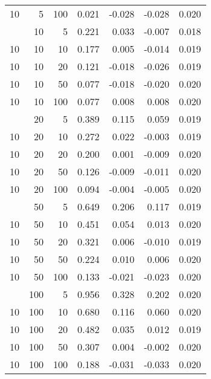 \begin{table}
\begin{tabular}[t]{lrrrrrr}
10 & 5 & 100 & 0.021 & -0.028 & -0.028 & 0.020\\
\addlinespace
10 & 10 & 5 & 0.221 & 0.033 & -0.007 & 0.018\\
10 & 10 & 10 & 0.177 & 0.005 & -0.014 & 0.019\\
10 & 10 & 20 & 0.121 & -0.018 & -0.026 & 0.019\\
10 & 10 & 50 & 0.077 & -0.018 & -0.020 & 0.020\\
10 & 10 & 100 & 0.077 & 0.008 & 0.008 & 0.020\\
\addlinespace
10 & 20 & 5 & 0.389 & 0.115 & 0.059 & 0.019\\
10 & 20 & 10 & 0.272 & 0.022 & -0.003 & 0.019\\
10 & 20 & 20 & 0.200 & 0.001 & -0.009 & 0.020\\
10 & 20 & 50 & 0.126 & -0.009 & -0.011 & 0.020\\
10 & 20 & 100 & 0.094 & -0.004 & -0.005 & 0.020\\
\addlinespace
10 & 50 & 5 & 0.649 & 0.206 & 0.117 & 0.019\\
10 & 50 & 10 & 0.451 & 0.054 & 0.013 & 0.020\\
10 & 50 & 20 & 0.321 & 0.006 & -0.010 & 0.019\\
10 & 50 & 50 & 0.224 & 0.010 & 0.006 & 0.020\\
10 & 50 & 100 & 0.133 & -0.021 & -0.023 & 0.020\\
\addlinespace
10 & 100 & 5 & 0.956 & 0.328 & 0.202 & 0.020\\
10 & 100 & 10 & 0.680 & 0.116 & 0.060 & 0.020\\
10 & 100 & 20 & 0.482 & 0.035 & 0.012 & 0.019\\
10 & 100 & 50 & 0.307 & 0.004 & -0.002 & 0.020\\
10 & 100 & 100 & 0.188 & -0.031 & -0.033 & 0.020\\
\bottomrule
\end{tabular}
\end{table}
